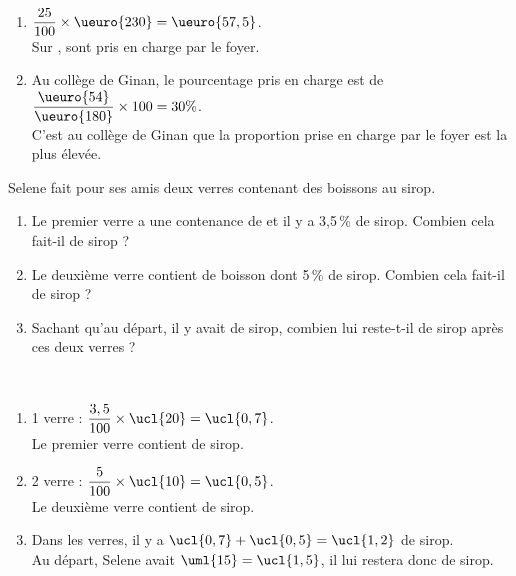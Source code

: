 \begin{colonne*exercice}
\begin{corrige}
   \ \\ [-5mm]
   \begin{enumerate}
      \item $\dfrac{25}{100}\times\ueuro{230} =\ueuro{57,5}$. \\ [2mm]
         Sur , {\blue {} sont pris en charge par le foyer}.
      \item Au collège de Ginan, le pourcentage pris en charge est de $\dfrac{\ueuro{54}}{\ueuro{180}}\times100 =30\%$. \\ [2mm]
      C'est au {\blue collège de Ginan que la proportion prise en charge par le foyer est la plus élevée}.
   \end{enumerate}
\end{corrige}

\bigskip


\begin{exercice} %
   Selene fait pour ses amis deux verres contenant des boissons au sirop.
      \begin{enumerate}
         \item Le premier verre a une contenance de  et il y a 3,5\,\% de sirop. Combien cela fait-il de sirop ?
         \item Le deuxième verre contient  de boisson dont 5\,\% de sirop. Combien cela fait-il de sirop ?
         \item Sachant qu'au départ, il y avait  de sirop, combien lui reste-t-il de sirop après ces deux verres ?
      \end{enumerate}
\end{exercice}
   
\begin{corrige}
\ \\ [-5mm]
   \begin{enumerate}
      \item 1 verre : $\dfrac{3,5}{100}\times\ucl{20} =\ucl{0,7}$. \\ [1mm]
         {\blue Le premier verre contient  de sirop}. \smallskip
      \item 2 verre : $\dfrac{5}{100}\times\ucl{10} =\ucl{0,5}$. \\ [1mm]
         {\blue Le deuxième verre contient  de sirop}.
      \item Dans les verres, il y a $\ucl{0,7}+\ucl{0,5} =\ucl{1,2}$ de sirop. \\
         Au départ, Selene avait $\uml{15} = \ucl{1,5}$, {\blue il lui restera donc  de sirop}.
   \end{enumerate}
\end{corrige}


\end{colonne*exercice}
